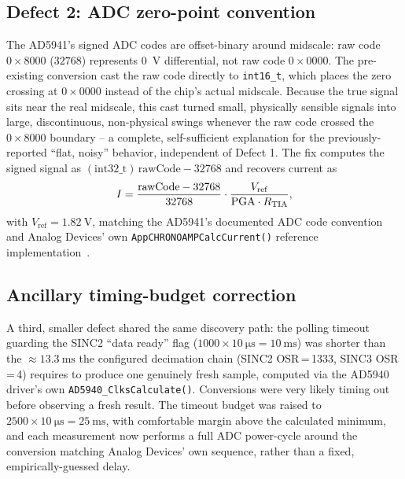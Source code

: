 \subsection{Defect 2: ADC zero-point convention}
\label{sec:adcfix}
The AD5941's signed ADC codes are offset-binary around midscale: raw code
$0{\times}8000$ ($32768$) represents \SI{0}{\volt} differential, not raw
code $0{\times}0000$. The pre-existing conversion cast the raw code
directly to \texttt{int16\_t}, which places the zero crossing at
$0{\times}0000$ instead of the chip's actual midscale. Because the true
signal sits near the real midscale, this cast turned small, physically
sensible signals into large, discontinuous, non-physical swings whenever
the raw code crossed the $0{\times}8000$ boundary -- a complete,
self-sufficient explanation for the previously-reported ``flat, noisy''
behavior, independent of Defect 1. The fix computes the signed signal as
$(\mathrm{int32\_t})\,\mathrm{rawCode} - 32768$ and recovers current as
\begin{equation}
I = \frac{\mathrm{rawCode} - 32768}{32768}\cdot\frac{V_{\mathrm{ref}}}{\mathrm{PGA}\cdot R_{\mathrm{TIA}}},
\label{eq:current}
\end{equation}
with $V_{\mathrm{ref}}=\SI{1.82}{\volt}$, matching the AD5941's documented
ADC code convention and Analog Devices' own
\texttt{AppCHRONOAMPCalcCurrent()} reference
implementation~\cite{ad5940_examples_github}.

\subsection{Ancillary timing-budget correction}
A third, smaller defect shared the same discovery path: the polling
timeout guarding the SINC2 ``data ready'' flag ($1000\times\SI{10}{\micro\second}=\SI{10}{\milli\second}$)
was shorter than the $\approx\SI{13.3}{\milli\second}$ the configured
decimation chain (SINC2 OSR\,=\,1333, SINC3 OSR\,=\,4) requires to produce
one genuinely fresh sample, computed via the AD5940 driver's own
\texttt{AD5940\_ClksCalculate()}. Conversions were very likely timing out
before observing a fresh result. The timeout budget was raised to
$2500\times\SI{10}{\micro\second}=\SI{25}{\milli\second}$, with comfortable
margin above the calculated minimum, and each measurement now performs a
full ADC power-cycle around the conversion matching Analog Devices' own
sequence, rather than a fixed, empirically-guessed delay.

